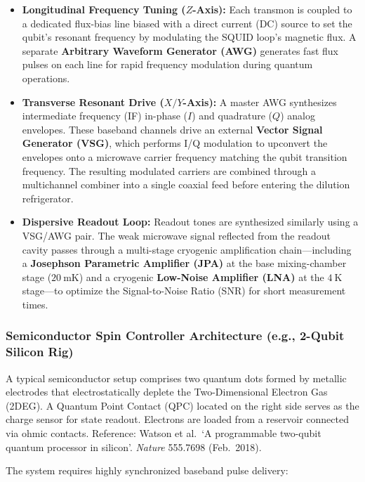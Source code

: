 \documentclass[
]{article}
\providecommand{\tightlist}{%
  \setlength{\itemsep}{0pt}\setlength{\parskip}{0pt}}
\begin{document}
\begin{itemize}
\tightlist
\item
  \textbf{Longitudinal Frequency Tuning (\(Z\)-Axis):} Each transmon is
  coupled to a dedicated flux-bias line biased with a direct current
  (DC) source to set the qubit's resonant frequency by modulating the
  SQUID loop's magnetic flux. A separate \textbf{Arbitrary Waveform
  Generator (AWG)} generates fast flux pulses on each line for rapid
  frequency modulation during quantum operations.
\item
  \textbf{Transverse Resonant Drive (\(X/Y\)-Axis):} A master AWG
  synthesizes intermediate frequency (IF) in-phase (\(I\)) and
  quadrature (\(Q\)) analog envelopes. These baseband channels drive an
  external \textbf{Vector Signal Generator (VSG)}, which performs I/Q
  modulation to upconvert the envelopes onto a microwave carrier
  frequency matching the qubit transition frequency. The resulting
  modulated carriers are combined through a multichannel combiner into a
  single coaxial feed before entering the dilution refrigerator.
\item
  \textbf{Dispersive Readout Loop:} Readout tones are synthesized
  similarly using a VSG/AWG pair. The weak microwave signal reflected
  from the readout cavity passes through a multi-stage cryogenic
  amplification chain---including a \textbf{Josephson Parametric
  Amplifier (JPA)} at the base mixing-chamber stage (\(20\ \text{mK}\))
  and a cryogenic \textbf{Low-Noise Amplifier (LNA)} at the
  \(4\ \text{K}\) stage---to optimize the Signal-to-Noise Ratio (SNR)
  for short measurement times.
\end{itemize}

\subsubsection{Semiconductor Spin Controller Architecture (e.g., 2-Qubit
Silicon
Rig)}\label{semiconductor-spin-controller-architecture-e.g.-2-qubit-silicon-rig}

A typical semiconductor setup comprises two quantum dots formed by
metallic electrodes that electrostatically deplete the Two-Dimensional
Electron Gas (2DEG). A Quantum Point Contact (QPC) located on the right
side serves as the charge sensor for state readout. Electrons are loaded
from a reservoir connected via ohmic contacts. Reference: Watson et
al.~`A programmable two-qubit quantum processor in silicon'.
\emph{Nature} 555.7698 (Feb.~2018).

The system requires highly synchronized baseband pulse delivery:
\end{document}
